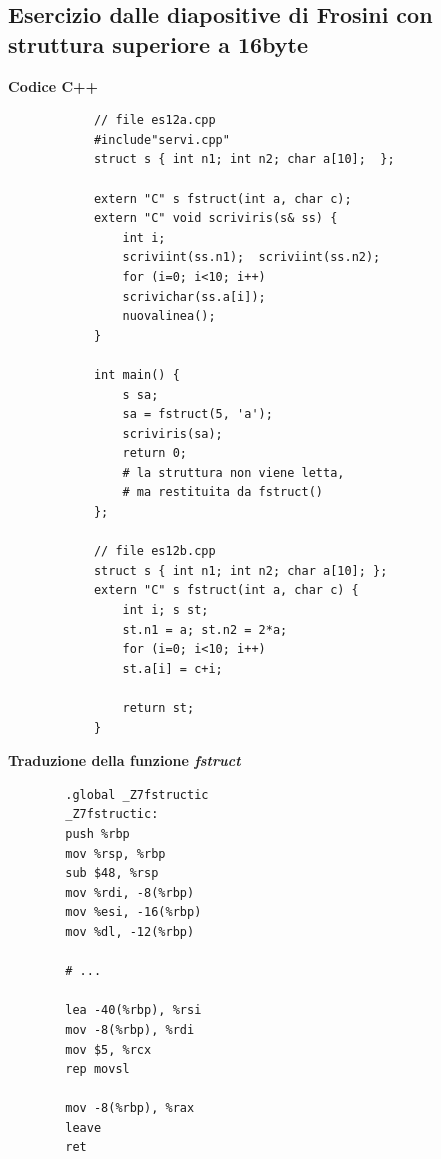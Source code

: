 \subsection{Esercizio dalle diapositive di Frosini con struttura superiore a 16byte}
\begingroup
\small
\begin{framed}
	\begin{multicols}{2}
		\noindent \textbf{Codice C++}
		\begin{verbatim}
			// file es12a.cpp
			#include"servi.cpp"
			struct s { int n1; int n2; char a[10];  };
			
			extern "C" s fstruct(int a, char c);
			extern "C" void scriviris(s& ss) { 
				int i;
				scriviint(ss.n1);  scriviint(ss.n2);
				for (i=0; i<10; i++)
				scrivichar(ss.a[i]);
				nuovalinea();
			}
			
			int main() { 
				s sa;
				sa = fstruct(5, 'a');
				scriviris(sa);
				return 0;
				# la struttura non viene letta,
				# ma restituita da fstruct()
			};
			
			// file es12b.cpp
			struct s { int n1; int n2; char a[10]; };
			extern "C" s fstruct(int a, char c) { 
				int i; s st;
				st.n1 = a; st.n2 = 2*a;
				for (i=0; i<10; i++) 
				st.a[i] = c+i;
				
				return st;
			}
		\end{verbatim}
	\end{multicols}
\end{framed}
\textbf{Traduzione della funzione \emph{fstruct}}
\begin{multicols}{2}
	\begin{verbatim}
		.global _Z7fstructic
		_Z7fstructic: 
		push %rbp
		mov %rsp, %rbp
		sub $48, %rsp
		mov %rdi, -8(%rbp)
		mov %esi, -16(%rbp)
		mov %dl, -12(%rbp)
		
		# ...
		
		lea -40(%rbp), %rsi
		mov -8(%rbp), %rdi
		mov $5, %rcx
		rep movsl
		
		mov -8(%rbp), %rax
		leave 
		ret
	\end{verbatim}
\end{multicols}
